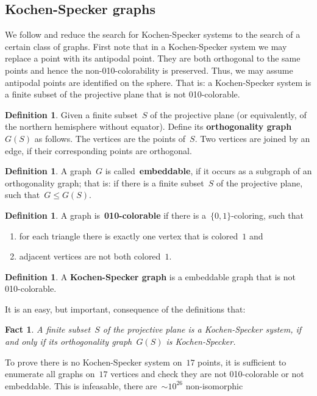 \documentclass[a4paper]{article}
\newcommand{\keyword}[1]{\textbf{#1}}
\newcounter{main}
\newtheorem{fact}[main]{Fact}
\theoremstyle{definition}
\newtheorem{dfn}[main]{Definition}
\theoremstyle{remark}
\begin{document}
\subsection{Kochen-Specker graphs}
\label{sec:ksgraphs}
We follow \cite{aow11} and reduce the search for Kochen-Specker systems
to the search of a certain class of graphs.
First note that in a Kochen-Specker system we may replace a point with its
antipodal point.  They are both orthogonal to the same points and hence
the non-010-colorability is preserved.
Thus, we may assume antipodal points are identified on the sphere.
That is: a Kochen-Specker system is a finite subset of the projective plane
that is not 010-colorable.
\begin{dfn}
Given a finite subset~$S$ of the projective plane
(or equivalently, of the northern hemisphere without equator).
Define its \keyword{orthogonality graph}~$G(S)$ as follows.
The vertices are the points of~$S$.
Two vertices are joined by an edge, if their corresponding points
are orthogonal.
\end{dfn}
\begin{dfn}
A graph~$G$ is called~\keyword{embeddable},
if it occurs as a subgraph of an orthogonality graph;
that is: if there is a finite subset~$S$ of the projective plane,
such that~$G \leq G(S)$.
\end{dfn}
\begin{dfn}
A graph is~\keyword{010-colorable}
if there is a~$\{0,1\}$-coloring, such that
\begin{enumerate}
\item
for each triangle there is exactly one vertex that is colored~$1$ and
\item
adjacent vertices are not both colored~$1$.
\end{enumerate}
\end{dfn}
\begin{dfn}
A \keyword{Kochen-Specker graph}
is a embeddable graph that is not 010-colorable.
\end{dfn}
It is an easy, but important, consequence of the definitions that:
\begin{fact}
    A finite subset~$S$ of the projective plane
    is a Kochen-Specker system,
    if and only if its orthogonality graph~$G(S)$
    is Kochen-Specker.
\end{fact}
To prove there is no Kochen-Specker system on~$17$ points,
it is sufficient to enumerate all graphs on~$17$ vertices
and check they are not 010-colorable or not embeddable.
This is infeasable, there are~${\sim}10^{26}$ non-isomorphic
\end{document}
